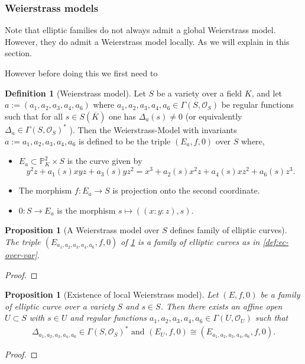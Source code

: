 \documentclass[a4paper,12pt,reqno]{amsart}
\newcommand{\field}[1]{\mathbb{#1}}  %
\renewcommand{\P}{\field{P}}
\newtheorem{proposition}[lemma]{Proposition}
\theoremstyle{definition}
\newtheorem{definition}[lemma]{Definition}
\numberwithin{lemma}{section}
\numberwithin{equation}{section}
\numberwithin{figure}{section}
\begin{document}
\subsubsection{Weierstrass models}

Note that elliptic families do not always admit a global Weierstrass model. However, they do admit a Weierstrass model locally. As we will explain in this section.

However before doing this we first need to

\begin{definition}[Weierstrass model]\label{def:weierstrass-model-over-var}
Let $S$ be a variety over a field $K$, and let $a := (a_1,a_2,a_3,a_4,a_6 )$ where $a_1,a_2,a_3,a_4,a_6 \in \Gamma(S,\mathcal O_S)$ be regular functions such that for all $s \in S(\overline K)$ one has $\Delta_{a}(s) \neq 0$ (or equivalently $\Delta_{a} \in \Gamma(S,\mathcal O_S)^*$ ). Then the Weierstrass-Model with invariants $a:={a_1,a_2,a_3,a_4,a_6}$ is defined to be the triple $(E_{a},f,0)$ over $S$ where, \begin{itemize}[label=-]
	\item $E_{a} \subset \P^2_K \times S$ is the curve given by
	$$y^2z+ a_1(s)xyz+a_3(s)yz^2=x^3+a_2(s)x^2z+a_4(s)xz^2+a_6(s)z^3.$$
	\item The morphism $f:  E_{a} \to S$ is projection onto the second coordinate.
	\item  $0 : S \to E_{a} $  is the morphism $s \mapsto ((x:y:z),s)$.
\end{itemize}
\end{definition}

\begin{proposition}[A Weierstrass model over $S$ defines family of elliptic curves]\label{stmt:smooth-weierstrass-over-var-is-ec}
The triple $(E_{a_1,a_2,a_3,a_4,a_6},f,0)$ of \cref{def:weierstrass-model-over-var} is a family of elliptic curves as in \cref{def:ec-over-var}.
\end{proposition}
\begin{proof}
\end{proof}

\begin{proposition}[Existence of local Weierstrass model]\label{stmt:ec-over-var-has-local-weierstrass-model}
	Let $(E,f,0)$ be a family of elliptic curve over a variety $S$ and $s\in S$. Then there exists an affine open $U \subset S$ with $s \in U$ and regular functions $a_1,a_2,a_3,a_4,a_6 \in \Gamma(U,\mathcal O_U)$ such that 
	\begin{align*}
	 \Delta_{a_1,a_2,a_3,a_4,a_6} \in \Gamma(S,\mathcal O_S)^* \text{ and }
	 (E_U,f,0) \cong (E_{a_1,a_2,a_3,a_4,a_6},f,0).
	\end{align*}
\end{proposition}
\begin{proof}
\end{proof}
\end{document}
